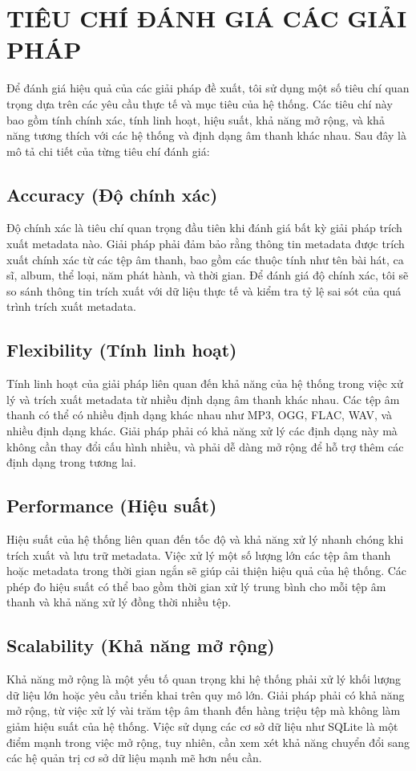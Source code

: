 \documentclass[conference]{IEEEtran}
\begin{document}
\section{TIÊU CHÍ ĐÁNH GIÁ CÁC GIẢI PHÁP}

Để đánh giá hiệu quả của các giải pháp đề xuất, tôi sử dụng một số tiêu chí quan trọng dựa trên các yêu cầu thực tế và mục tiêu của hệ thống. Các tiêu chí này bao gồm tính chính xác, tính linh hoạt, hiệu suất, khả năng mở rộng, và khả năng tương thích với các hệ thống và định dạng âm thanh khác nhau. Sau đây là mô tả chi tiết của từng tiêu chí đánh giá:

\subsection{Accuracy (Độ chính xác)}
Độ chính xác là tiêu chí quan trọng đầu tiên khi đánh giá bất kỳ giải pháp trích xuất metadata nào. Giải pháp phải đảm bảo rằng thông tin metadata được trích xuất chính xác từ các tệp âm thanh, bao gồm các thuộc tính như tên bài hát, ca sĩ, album, thể loại, năm phát hành, và thời gian. Để đánh giá độ chính xác, tôi sẽ so sánh thông tin trích xuất với dữ liệu thực tế và kiểm tra tỷ lệ sai sót của quá trình trích xuất metadata.

\subsection{Flexibility (Tính linh hoạt)}
Tính linh hoạt của giải pháp liên quan đến khả năng của hệ thống trong việc xử lý và trích xuất metadata từ nhiều định dạng âm thanh khác nhau. Các tệp âm thanh có thể có nhiều định dạng khác nhau như MP3, OGG, FLAC, WAV, và nhiều định dạng khác. Giải pháp phải có khả năng xử lý các định dạng này mà không cần thay đổi cấu hình nhiều, và phải dễ dàng mở rộng để hỗ trợ thêm các định dạng trong tương lai.

\subsection{Performance (Hiệu suất)}
Hiệu suất của hệ thống liên quan đến tốc độ và khả năng xử lý nhanh chóng khi trích xuất và lưu trữ metadata. Việc xử lý một số lượng lớn các tệp âm thanh hoặc metadata trong thời gian ngắn sẽ giúp cải thiện hiệu quả của hệ thống. Các phép đo hiệu suất có thể bao gồm thời gian xử lý trung bình cho mỗi tệp âm thanh và khả năng xử lý đồng thời nhiều tệp.

\subsection{Scalability (Khả năng mở rộng)}
Khả năng mở rộng là một yếu tố quan trọng khi hệ thống phải xử lý khối lượng dữ liệu lớn hoặc yêu cầu triển khai trên quy mô lớn. Giải pháp phải có khả năng mở rộng, từ việc xử lý vài trăm tệp âm thanh đến hàng triệu tệp mà không làm giảm hiệu suất của hệ thống. Việc sử dụng các cơ sở dữ liệu như SQLite là một điểm mạnh trong việc mở rộng, tuy nhiên, cần xem xét khả năng chuyển đổi sang các hệ quản trị cơ sở dữ liệu mạnh mẽ hơn nếu cần.
\end{document}
